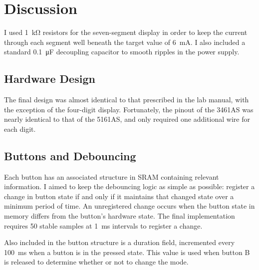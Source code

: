 \documentclass[12pt,letterpaper]{article}
\begin{document}
\section{Discussion}
I used \SI{1}{\kilo\ohm} resistors for the seven-segment display
in order to keep the current through each segment well beneath the target value
of \SI{6}{mA}. I also included a standard \SI{0.1}{\micro\farad} decoupling
capacitor to smooth ripples in the power supply.

\subsection{Hardware Design}
The final design was almost identical to that prescribed in the lab manual, with
the exception of the four-digit display. Fortunately, the pinout of the 3461AS
was nearly identical to that of the 5161AS, and only required one additional
wire for each digit.

\subsection{Buttons and Debouncing}
Each button has an associated structure in SRAM containing relevant information.
I aimed to keep the debouncing logic as simple as possible: register a change
in button state if and only if it maintains that changed state over a minimum
period of time. An unregistered change occurs when the button state in memory
differs from the button's hardware state. The final implementation requires
50 stable samples at \SI{1}{ms} intervals to register a change.
\par Also included in the button structure is a duration field, incremented
every \SI{100}{ms} when a button is in the pressed state. This value is used
when button B is released to determine whether or not to change the mode.
\end{document}
